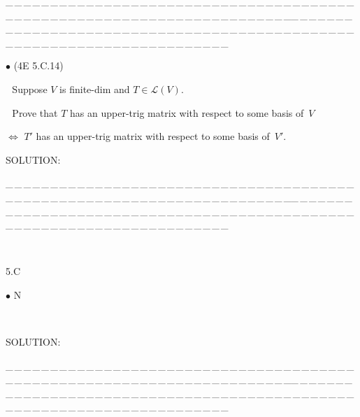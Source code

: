 \documentclass[a4paper, 11pt, UTF8]{article}
\def\Lm{\mathcal{L}}
\begin{document}
\begin{large}
\par
{\tiny \_\,\_\,\_\,\_\,\_\,\_\,\_\,\_\,\_\,\_\,\_\,\_\,\_\,\_\,\_\,\_\,\_\,\_\,\_\,\_\,\_\,\_\,\_\,\_\,\_\,\_\,\_\,\_\,\_\,\_\,\_\,\_\,\_\,\_\,\_\,\_\,\_\,\_\,\_\,\_\,\_\,\_\,\_\,\_\,\_\,\_\,\_\,\_\,\_\,\_\,\_\,\_\,\_\,\_\,\_\,\_\,\_\,\_\,\_\,\_\,\_\,\_\,\_\,\_\,\_\,\_\,\_\,\_\,\_\,\_\,\_\_\,\_\,\_\,\_\,\_\,\_\,\_\,\_\,\_\,\_\,\_\,\_\,\_\,\_\,\_\,\_\,\_\,\_\,\_\,\_\,\_\,\_\,\_\,\_\,\_\,\_\,\_\,\_\,\_\,\_\,\_\,\_\,\_\,\_\,\_\,\_\,\_\,\_\,\_\,\_\,\_\,\_\,\_\,\_\,\_\,\_\,\_\,\_\,\_\,\_\,\_\,\_\,\_\,\_\,\_\,\_\,\_\,\_\,\_\,\_\,\_\,\_\,\_\,\_\,\_\,\_\,\_\,\_\,\_\,\_\,\_}\par

{\small $\bullet$} (\normalsize{4E 5.C.14})\par\,\, {\timessl\Large 
Suppose $V$ is finite-dim and $T\in \Lm(V)$.}\par\,\,
{\timessl\Large Prove that $T$ has an upper-trig matrix with respect to some basis of \,$V$}\par\qquad\quad
{\timessl\Large $\Longleftrightarrow$ $T'$ has an upper-trig matrix with respect to some basis of \,$V'$.
}\par
{\timesbf S\footnotesize{OLUTION:}}\par\quad

\par
{\tiny \_\,\_\,\_\,\_\,\_\,\_\,\_\,\_\,\_\,\_\,\_\,\_\,\_\,\_\,\_\,\_\,\_\,\_\,\_\,\_\,\_\,\_\,\_\,\_\,\_\,\_\,\_\,\_\,\_\,\_\,\_\,\_\,\_\,\_\,\_\,\_\,\_\,\_\,\_\,\_\,\_\,\_\,\_\,\_\,\_\,\_\,\_\,\_\,\_\,\_\,\_\,\_\,\_\,\_\,\_\,\_\,\_\,\_\,\_\,\_\,\_\,\_\,\_\,\_\,\_\,\_\,\_\,\_\,\_\,\_\,\_\_\,\_\,\_\,\_\,\_\,\_\,\_\,\_\,\_\,\_\,\_\,\_\,\_\,\_\,\_\,\_\,\_\,\_\,\_\,\_\,\_\,\_\,\_\,\_\,\_\,\_\,\_\,\_\,\_\,\_\,\_\,\_\,\_\,\_\,\_\,\_\,\_\,\_\,\_\,\_\,\_\,\_\,\_\,\_\,\_\,\_\,\_\,\_\,\_\,\_\,\_\,\_\,\_\,\_\,\_\,\_\,\_\,\_\,\_\,\_\,\_\,\_\,\_\,\_\,\_\,\_\,\_\,\_\,\_\,\_\,\_}\par

\par{\tiny\,\par}

{\huge\timesbf 5.C} %


{\small $\bullet$}
{\timesbf\Large N} {\timessl\Large 
}\par\quad\,
{\timessl\Large
}\par
{\timesbf S\footnotesize{OLUTION:}}\par\quad

\par
{\tiny \_\,\_\,\_\,\_\,\_\,\_\,\_\,\_\,\_\,\_\,\_\,\_\,\_\,\_\,\_\,\_\,\_\,\_\,\_\,\_\,\_\,\_\,\_\,\_\,\_\,\_\,\_\,\_\,\_\,\_\,\_\,\_\,\_\,\_\,\_\,\_\,\_\,\_\,\_\,\_\,\_\,\_\,\_\,\_\,\_\,\_\,\_\,\_\,\_\,\_\,\_\,\_\,\_\,\_\,\_\,\_\,\_\,\_\,\_\,\_\,\_\,\_\,\_\,\_\,\_\,\_\,\_\,\_\,\_\,\_\,\_\_\,\_\,\_\,\_\,\_\,\_\,\_\,\_\,\_\,\_\,\_\,\_\,\_\,\_\,\_\,\_\,\_\,\_\,\_\,\_\,\_\,\_\,\_\,\_\,\_\,\_\,\_\,\_\,\_\,\_\,\_\,\_\,\_\,\_\,\_\,\_\,\_\,\_\,\_\,\_\,\_\,\_\,\_\,\_\,\_\,\_\,\_\,\_\,\_\,\_\,\_\,\_\,\_\,\_\,\_\,\_\,\_\,\_\,\_\,\_\,\_\,\_\,\_\,\_\,\_\,\_\,\_\,\_\,\_\,\_\,\_}\par


\end{large}
\end{document}
